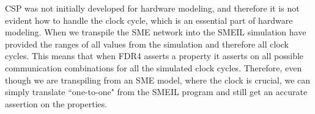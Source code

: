 CSP was not initially developed for hardware modeling, and therefore it is not evident how to handle the clock cycle, which is an essential part of hardware modeling. When we transpile the SME network into \cspm{} the SMEIL simulation have provided the ranges of all values from the simulation and therefore all clock cycles. This means that when FDR4 asserts a property it asserts on all possible communication combinations for all the simulated clock cycles. Therefore, even though we are transpiling from an SME model, where the clock is crucial, we can simply translate ``one-to-one" from the SMEIL program and still get an accurate assertion on the properties.

